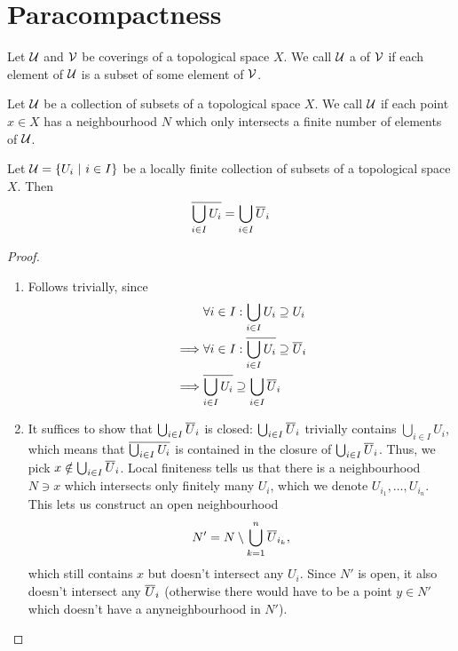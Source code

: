 \section{Paracompactness}
\begin{definition}
	Let $\mathcal{U}$ and $\mathcal{V}$ be coverings of a topological space $X$. We call $\mathcal{U}$ a  of $\mathcal{V}$ if each element of $\mathcal{U}$ is a subset of some element of $\mathcal{V}$.
\end{definition}
\begin{definition}
	Let $\mathcal{U}$ be a collection of subsets of a topological space $X$. We call $\mathcal{U}$  if each point $x \in X$ has a neighbourhood $N$ which only intersects a finite number of elements of $\mathcal{U}$.
\end{definition}
\begin{theorem}
	\label{th:locallyfiniteclosure}
	Let $\mathcal{U} = \qty{U_i ~\middle|~i \in I}$ be a locally finite collection of subsets of a topological space $X$. Then
	\begin{align*}
		\overline{{\bigcup_{i \in I} U_i}} = \bigcup_{i \in I} \overline{{U}}_i
	\end{align*}
\end{theorem}
\begin{proof}
	\begin{enumerate}
		\item[$\supseteq$:] Follows trivially, since
		\begin{align*}
			&\forall i \in I : \bigcup_{i \in I} U_i \supseteq U_i\\
			\implies &\forall i \in I : \overline{{\bigcup_{i \in I} U_i}} \supseteq \overline{{U}}_i\\
			\implies &\overline{{\bigcup_{i \in I} U_i}} \supseteq \bigcup_{i \in I} \overline{{U}}_i
		\end{align*}
		\item[$\subseteq$:] It suffices to show that $\bigcup_{i \in I} \overline{{U}}_i$ is closed: $\bigcup_{i \in I} \overline{{U}}_i$ trivially contains $\bigcup_{i \in I} U_i$, which means that $\overline{{\bigcup_{i \in I} U_i}}$ is contained in the closure of $\bigcup_{i \in I} \overline{{U}}_i$.
		\newpar
		Thus, we pick $x \notin \bigcup_{i \in I} \overline{{U}}_i$. Local finiteness tells us that there is a neighbourhood $N \ni x$ which intersects only finitely many $U_i$, which we denote $U_{i_1}, \hdots, U_{i_n}$. This lets us construct an open neighbourhood
		\begin{align*}
			N' = N \setminus \bigcup_{k = 1}^n \overline{{U}}_{i_k},
		\end{align*}
		which still contains $x$ but doesn't intersect any $U_i$. Since $N'$ is open, it also doesn't intersect any $\overline{{U}}_i$ (otherwise there would have to be a point $y \in N'$ which doesn't have a anyneighbourhood in $N'$).
	\end{enumerate}
\end{proof}
